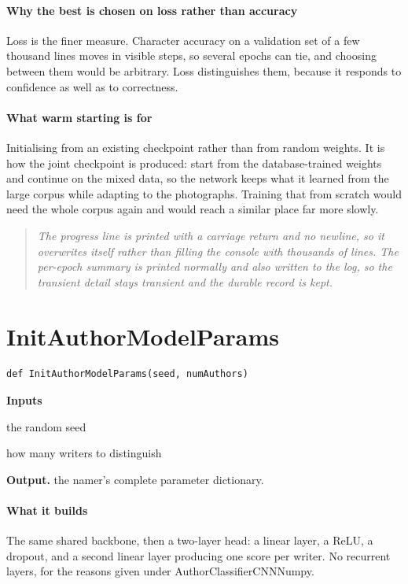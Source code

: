 \paragraph{Why the best is chosen on loss rather than accuracy}
Loss is the finer measure. Character accuracy on a validation set of a few thousand lines moves in visible steps, so several epochs can tie, and choosing between them would be arbitrary. Loss distinguishes them, because it responds to confidence as well as to correctness.


\paragraph{What warm starting is for}
Initialising from an existing checkpoint rather than from random weights. It is how the joint checkpoint is produced: start from the database-trained weights and continue on the mixed data, so the network keeps what it learned from the large corpus while adapting to the photographs. Training that from scratch would need the whole corpus again and would reach a similar place far more slowly.


\begin{quote}\small\itshape The progress line is printed with a carriage return and no newline, so it overwrites itself rather than filling the console with thousands of lines. The per-epoch summary is printed normally and also written to the log, so the transient detail stays transient and the durable record is kept.\end{quote}

\section{InitAuthorModelParams}
\begin{lstlisting}[style=sig]
def InitAuthorModelParams(seed, numAuthors)
\end{lstlisting}

\noindent\textbf{Inputs}
\begin{description}[leftmargin=2.2em,style=nextline,font=\normalfont\ttfamily]\setlength\itemsep{1pt}
  \item[{seed}] \normalfont the random seed
  \item[{numAuthors}] \normalfont how many writers to distinguish
\end{description}

\noindent\textbf{Output.} the namer's complete parameter dictionary.


\paragraph{What it builds}
The same shared backbone, then a two-layer head: a linear layer, a ReLU, a dropout, and a second linear layer producing one score per writer. No recurrent layers, for the reasons given under AuthorClassifierCNNNumpy.



